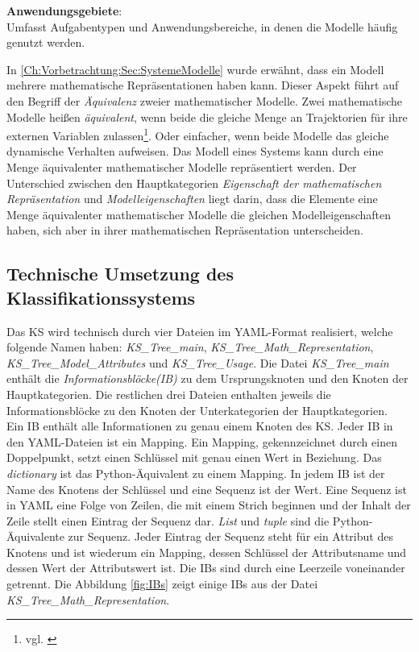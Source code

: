 \textbf{Anwendungsgebiete}: \\
Umfasst Aufgabentypen und Anwendungsbereiche, in denen die Modelle häufig genutzt werden.

In \autoref{Ch:Vorbetrachtung:Sec:SystemeModelle} wurde erwähnt, dass ein Modell mehrere mathematische Repräsentationen haben kann. Dieser Aspekt führt auf den Begriff der \textit{Äquivalenz} zweier mathematischer Modelle. Zwei mathematische Modelle heißen \textit{äquivalent}, wenn beide die gleiche Menge an Trajektorien für ihre externen Variablen zulassen\footnote{vgl. \cite[S. 34]{SCH89}}. Oder einfacher, wenn beide Modelle das gleiche dynamische Verhalten aufweisen. Das Modell eines Systems kann durch eine Menge äquivalenter mathematischer Modelle repräsentiert werden. Der Unterschied zwischen den Hauptkategorien \textit{Eigenschaft der mathematischen Repräsentation} und \textit{Modelleigenschaften} liegt darin, dass die Elemente eine Menge äquivalenter mathematischer Modelle die gleichen Modelleigenschaften haben, sich aber in ihrer mathematischen Repräsentation unterscheiden.

\subsection{Technische Umsetzung des Klassifikationssystems}
\label{Ch:Ergebnisse:Sec:KS:SubSec:TechUmsetzung}
Das KS wird technisch durch vier Dateien im YAML-Format realisiert, welche folgende Namen haben: \textit{KS\_Tree\_main}, \textit{KS\_Tree\_Math\_Representation}, \textit{KS\_Tree\_Model\_Attributes} und \textit{KS\_Tree\_Usage}. Die Datei \textit{KS\_Tree\_main} enthält die \textit{Informationsblöcke(IB)} zu dem Ursprungsknoten und den Knoten der Hauptkategorien. Die restlichen drei Dateien enthalten jeweils die Informationsblöcke zu den Knoten der Unterkategorien der Hauptkategorien. \\ 
Ein IB enthält alle Informationen zu genau einem Knoten des KS. Jeder IB in den YAML-Dateien ist ein Mapping. Ein Mapping, gekennzeichnet durch einen Doppelpunkt, setzt einen Schlüssel mit genau einen Wert in Beziehung. Das \textit{dictionary} ist das Python-Äquivalent zu einem Mapping. In jedem IB ist der Name des Knotens der Schlüssel und eine Sequenz ist der Wert. Eine Sequenz ist in YAML eine Folge von Zeilen, die mit einem Strich beginnen und der Inhalt der Zeile stellt einen Eintrag der Sequenz dar. \textit{List} und \textit{tuple} sind die Python-Äquivalente zur Sequenz. Jeder Eintrag der Sequenz steht für ein Attribut des Knotens und ist wiederum ein Mapping, dessen Schlüssel der Attributsname und dessen Wert der Attributswert ist. Die IB\grq s sind durch eine Leerzeile voneinander getrennt. Die Abbildung \ref{fig:IBs} zeigt einige IB\grq s aus der Datei \textit{KS\_Tree\_Math\_Representation}.

